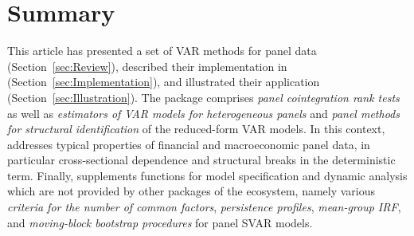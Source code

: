 
\section{Summary} \label{sec:Summary}
This article has presented a set of VAR methods for panel data (Section~\ref{sec:Review}), described their implementation in  (Section~\ref{sec:Implementation}), and illustrated their application (Section~\ref{sec:Illustration}). The  package comprises \textit{panel cointegration rank tests} as well as \textit{estimators of VAR models for heterogeneous panels} and \textit{panel methods for structural identification} of the reduced-form VAR models. In this context,  addresses typical properties of financial and macroeconomic panel data, in particular cross-sectional dependence and structural breaks in the deterministic term. Finally,  supplements functions for model specification and dynamic analysis which are not provided by other packages of the  ecosystem, namely various \textit{criteria for the number of common factors}, \textit{persistence profiles}, \textit{mean-group IRF}, and \textit{moving-block bootstrap procedures} for panel SVAR models.


